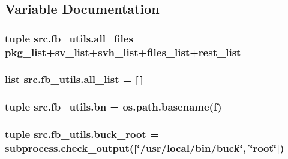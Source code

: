 \subsection{Variable Documentation}
\hypertarget{namespacesrc_1_1fb__utils_ac4cea1647165c2b200ee1507d4385d9c}{
\subsubsection[{all\-\_\-files}]{\setlength{\rightskip}{0pt plus 5cm}tuple src.\-fb\-\_\-utils.\-all\-\_\-files = {\bf pkg\-\_\-list}+{\bf sv\-\_\-list}+{\bf svh\-\_\-list}+{\bf files\-\_\-list}+{\bf rest\-\_\-list}}}\label{namespacesrc_1_1fb__utils_ac4cea1647165c2b200ee1507d4385d9c}
\hypertarget{namespacesrc_1_1fb__utils_a537838206095ac211484b3d6f0e7ab49}{
\subsubsection[{all\-\_\-list}]{\setlength{\rightskip}{0pt plus 5cm}list src.\-fb\-\_\-utils.\-all\-\_\-list = \mbox{[}$\,$\mbox{]}}}\label{namespacesrc_1_1fb__utils_a537838206095ac211484b3d6f0e7ab49}
\hypertarget{namespacesrc_1_1fb__utils_adddc80ad56f52f8f4d9480c01d8eb23f}{
\subsubsection[{bn}]{\setlength{\rightskip}{0pt plus 5cm}tuple src.\-fb\-\_\-utils.\-bn = os.\-path.\-basename({\bf f})}}\label{namespacesrc_1_1fb__utils_adddc80ad56f52f8f4d9480c01d8eb23f}
\hypertarget{namespacesrc_1_1fb__utils_ada262490c393f4f9b3af89babf6508e2}{
\subsubsection[{buck\-\_\-root}]{\setlength{\rightskip}{0pt plus 5cm}tuple src.\-fb\-\_\-utils.\-buck\-\_\-root = subprocess.\-check\-\_\-output(\mbox{[}\char`\"{}/usr/local/bin/buck\char`\"{}, \char`\"{}root\char`\"{}\mbox{]})}}\label{namespacesrc_1_1fb__utils_ada262490c393f4f9b3af89babf6508e2}
